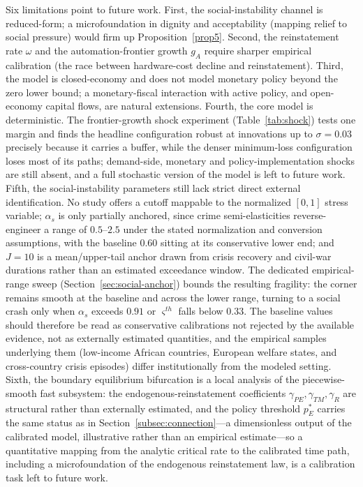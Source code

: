 \documentclass[review,12pt]{elsarticle}
\theoremstyle{plain}
\theoremstyle{definition}
\theoremstyle{remark}
\begin{document}
Six limitations point to future work. First, the social-instability channel is reduced-form; a microfoundation in dignity and acceptability (mapping relief to social pressure) would firm up Proposition~\ref{prop5}. Second, the reinstatement rate $\omega$ and the automation-frontier growth $g_A$ require sharper empirical calibration (the race between hardware-cost decline and reinstatement). Third, the model is closed-economy and does not model monetary policy beyond the zero lower bound; a monetary-fiscal interaction with active policy, and open-economy capital flows, are natural extensions. Fourth, the core model is deterministic. The frontier-growth shock experiment (Table~\ref{tab:shock}) tests one margin and finds the headline configuration robust at innovations up to $\sigma=0.03$ precisely because it carries a buffer, while the denser minimum-loss configuration loses most of its paths; demand-side, monetary and policy-implementation shocks are still absent, and a full stochastic version of the model is left to future work. Fifth, the social-instability parameters still lack strict direct external identification. No study offers a cutoff mappable to the normalized $[0,1]$ stress variable; $\alpha_s$ is only partially anchored, since crime semi-elasticities reverse-engineer a range of $0.5$--$2.5$ under the stated normalization and conversion assumptions, with the baseline $0.60$ sitting at its conservative lower end; and $J=10$ is a mean/upper-tail anchor drawn from crisis recovery and civil-war durations rather than an estimated exceedance window. The dedicated empirical-range sweep (Section~\ref{sec:social-anchor}) bounds the resulting fragility: the corner remains smooth at the baseline and across the lower range, turning to a social crash only when $\alpha_s$ exceeds $0.91$ or $\varsigma^{th}$ falls below $0.33$. The baseline values should therefore be read as conservative calibrations not rejected by the available evidence, not as externally estimated quantities, and the empirical samples underlying them (low-income African countries, European welfare states, and cross-country crisis episodes) differ institutionally from the modeled setting. Sixth, the boundary equilibrium bifurcation is a local analysis of the piecewise-smooth fast subsystem: the endogenous-reinstatement coefficients $\gamma_{PE},\gamma_{TM},\gamma_R$ are structural rather than externally estimated, and the policy threshold $p_E^*$ carries the same status as in Section~\ref{subsec:connection}---a dimensionless output of the calibrated model, illustrative rather than an empirical estimate---so a quantitative mapping from the analytic critical rate to the calibrated time path, including a microfoundation of the endogenous reinstatement law, is a calibration task left to future work.
\end{document}
